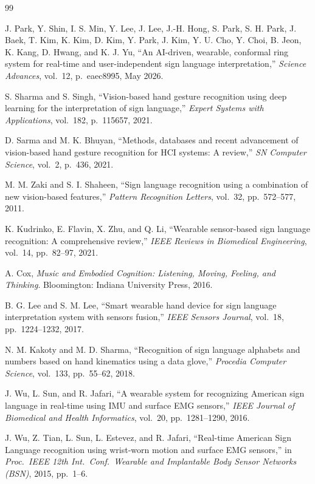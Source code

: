 \documentclass[11pt, a4paper]{article}
\theoremstyle{definition}
\begin{document}
\newpage
\begin{thebibliography}{99}

J. Park, Y. Shin, I. S. Min, Y. Lee, J. Lee, J.-H. Hong, S. Park, S. H. Park, J. Baek, T. Kim, K. Kim, D. Kim, Y. Park, J. Kim, Y. U. Cho, Y. Choi, B. Jeon, K. Kang, D. Hwang, and K. J. Yu,
``An AI-driven, wearable, conformal ring system for real-time and user-independent sign language interpretation,''
\textit{Science Advances}, vol.~12, p.~eaec8995, May 2026.

S. Sharma and S. Singh,
``Vision-based hand gesture recognition using deep learning for the interpretation of sign language,''
\textit{Expert Systems with Applications}, vol.~182, p.~115657, 2021.

D. Sarma and M. K. Bhuyan,
``Methods, databases and recent advancement of vision-based hand gesture recognition for HCI systems: A review,''
\textit{SN Computer Science}, vol.~2, p.~436, 2021.

M. M. Zaki and S. I. Shaheen,
``Sign language recognition using a combination of new vision-based features,''
\textit{Pattern Recognition Letters}, vol.~32, pp.~572--577, 2011.

K. Kudrinko, E. Flavin, X. Zhu, and Q. Li,
``Wearable sensor-based sign language recognition: A comprehensive review,''
\textit{IEEE Reviews in Biomedical Engineering}, vol.~14, pp.~82--97, 2021.

A. Cox,
\textit{Music and Embodied Cognition: Listening, Moving, Feeling, and Thinking}.
Bloomington: Indiana University Press, 2016.

B. G. Lee and S. M. Lee,
``Smart wearable hand device for sign language interpretation system with sensors fusion,''
\textit{IEEE Sensors Journal}, vol.~18, pp.~1224--1232, 2017.

N. M. Kakoty and M. D. Sharma,
``Recognition of sign language alphabets and numbers based on hand kinematics using a data glove,''
\textit{Procedia Computer Science}, vol.~133, pp.~55--62, 2018.

J. Wu, L. Sun, and R. Jafari,
``A wearable system for recognizing American sign language in real-time using IMU and surface EMG sensors,''
\textit{IEEE Journal of Biomedical and Health Informatics}, vol.~20, pp.~1281--1290, 2016.

J. Wu, Z. Tian, L. Sun, L. Estevez, and R. Jafari,
``Real-time American Sign Language recognition using wrist-worn motion and surface EMG sensors,''
in \textit{Proc.\ IEEE 12th Int.\ Conf.\ Wearable and Implantable Body Sensor Networks (BSN)}, 2015, pp.~1--6.


\end{thebibliography}
\end{document}

